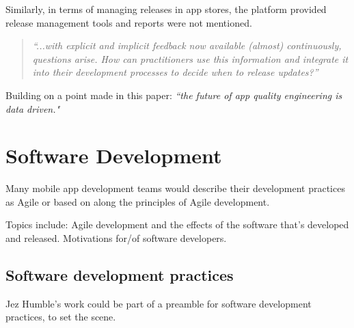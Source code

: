Similarly, in terms of managing releases in app stores, the platform provided release management tools and reports were not mentioned. 

\begin{quote}
    \emph{``...with explicit and implicit feedback now available (almost) continuously, questions arise. How can practitioners use this information and integrate it into their development processes to decide when to release updates?''}\citep[pp. 48-49]{maalej2016_towards_data_driven_requirements_engineering}    
\end{quote}

Building on a point made in this paper: \emph{``the future of app quality engineering is data driven."}~\citep[p. 24]{nagappan2016_future_trends_in_sw_eng_for_mobile_apps} %





\section{Software Development}
Many mobile app development teams would describe their development practices as Agile or based on along the principles of Agile development. %

Topics include: Agile development and the effects of the software that's developed and released. Motivations for/of software developers.

\subsection{Software development practices}
Jez Humble's work could be part of a preamble for software development practices, to set the scene.

